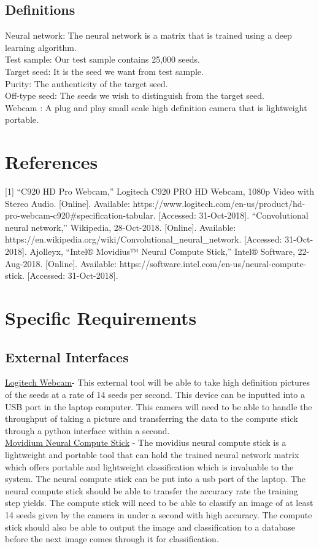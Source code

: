 \documentclass[onecolumn, draftclsnofoot,10pt, compsoc]{IEEEtran}
\begin{document}
\subsection{Definitions}
Neural network: The neural network is a matrix that is trained using a deep learning algorithm. \\
Test sample: Our test sample contains 25,000 seeds. \\
Target seed: It is the seed we want from test sample. \\
Purity: The authenticity of the target seed. \\
Off-type seed: The seeds we wish to distinguish from the target seed. \\
Webcam : A plug and play small scale high definition camera that is lightweight portable. 


\section{References}
[1] “C920 HD Pro Webcam,” Logitech C920 PRO HD Webcam, 1080p Video with Stereo Audio. [Online]. Available: https://www.logitech.com/en-us/product/hd-pro-webcam-c920#specification-tabular. [Accessed: 31-Oct-2018]. \newline
[2] “Convolutional neural network,” Wikipedia, 28-Oct-2018. [Online]. Available: https://en.wikipedia.org/wiki/Convolutional\_neural\_network. [Accessed: 31-Oct-2018]. \newline
[3] Ajolleyx, “Intel® Movidius™ Neural Compute Stick,” Intel® Software, 22-Aug-2018. [Online]. Available: https://software.intel.com/en-us/neural-compute-stick. [Accessed: 31-Oct-2018].

\section{Specific Requirements}
\subsection{External Interfaces}
\underline{Logitech Webcam}- This external tool will be able to take high definition pictures of the seeds at a rate of 14 seeds per second. This device can be inputted into a USB port in the laptop computer. This camera will need to be able to handle the throughput of taking a picture and transferring the data to the compute stick through a python interface within a second. \\
\underline{Movidium Neural Compute Stick} - The movidius neural compute stick is a lightweight and portable tool that can hold the trained neural network matrix which offers portable and lightweight classification which is invaluable to the system. The neural compute stick can be put into a usb port of the laptop. The neural compute stick should be able to transfer the accuracy rate the training step yields. The compute stick will need to be able to classify an image of at least 14 seeds given by the camera in under a second with high accuracy. The compute stick should also be able to output the image and classification to a database before the next image comes through it for classification. 
\end{document}
